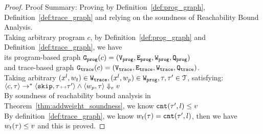 \begin{proof}
Proof Summary: Proving by Definition~\ref{def:prog_graph}, Definition~\ref{def:trace_graph} and relying on the soundness of Reachability Bound 
Analysis.
\\
Taking arbitrary program $c$,
by Definition~\ref{def:prog_graph} and Definition~\ref{def:trace_graph}, 
we have   
\\
its program-based graph $\mathtt{{G_{prog}}}({c}) = (\mathtt{{V_{prog}}}, \mathtt{{E_{prog}}}, \mathtt{{W_{prog}}}, \mathtt{{Q_{prog}}})$ 
\\
and 
trace-based graph $\mathtt{{G_{trace}}}({c}) = (\mathtt{{V_{trace}}}, \mathtt{{E_{trace}}}, \mathtt{{W_{trace}}}, \mathtt{{Q_{trace}}})$.
\\
Taking arbitrary 
$(x^l, w_{t}) \in \mathtt{{W_{trace}}}, (x^l, w_{p}) \in \mathtt{{W_{prog}}}, \mathtt{\tau}, \mathtt{\tau}' \in \mathcal{T}$, satisfying:
\\
$\langle {c}, \mathtt{\tau} \rangle \to^{*} \langle \mathtt{skip}, \mathtt{\tau}{\scriptscriptstyle ++}\mathtt{\tau}' \rangle 
\land 
\langle w_{p}, \mathtt{\tau} \rangle \Downarrow_e v$
\\
By soundness of reachability bound analysis in Theorem~\ref{thm:addweight_soundness}, we know 
$\mathtt{cnt}(\mathtt{\tau}', l) \leq v$
\\
By definition~\ref{def:trace_graph}, we know $w_t(\mathtt{\tau}) = \mathtt{cnt}(\mathtt{\tau}', l)$,
then we have $w_t(\mathtt{\tau}) \leq v$ and this is proved.
\end{proof}
